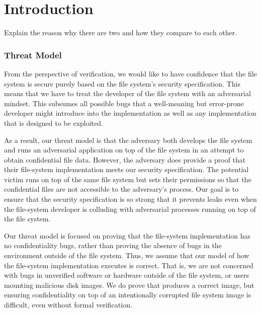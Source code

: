 \chapter{Introduction}

Explain the reason why there are two and how they compare to each other.



\subsection{Threat Model}
From the perspective of verification, we would like to have confidence
that the file system is secure purely based on the file system's security
specification.  This means that we have to treat the developer of the
file system with an adversarial mindset.  This subsumes all possible
bugs that a well-meaning but error-prone developer might introduce into
the implementation as well as any implementation that is designed to be exploited.

As a result, our threat model is that the adversary both develops the
file system and runs an adversarial application on top of the file system
in an attempt to obtain confidential file data.  However, the adversary
does provide a proof that their file-system implementation meets our
security specification.  The potential victim runs on top of the same
file system but sets their permissions so that the confidential files
are not accessible to the adversary's process.  Our goal is to ensure
that the security specification is so strong that it prevents leaks even
when the file-system developer is colluding with adversarial processes
running on top of the file system.

Our threat model is focused on proving that the file-system implementation has
no confidentiality bugs, rather than proving the absence of bugs in the
environment outside of the file system. Thus, we assume that our model
of how the file-system implementation executes is correct.  That is, we are not
concerned with bugs in unverified software or hardware outside of the file
system, or users mounting malicious disk images.  We do prove that
 produces a correct image, but ensuring confidentiality on top of an
intentionally corrupted file system image is difficult, even without formal
verification. 


